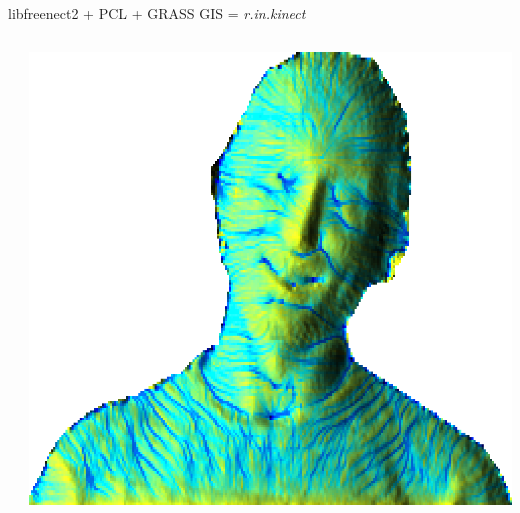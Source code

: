 \documentclass[xcolor={dvipsnames,usenames},beamer,aspectratio=169]{beamer}
\newcommand{\module}[1]{\emph{#1}}
\begin{document}
\begin{frame}{libfreenect2 + PCL + GRASS GIS = \module{r.in.kinect}}
\begin{columns}
\begin{column}{0.5\textwidth}
\begin{columns}
\begin{column}{0.2\textwidth}
\end{column}
\end{columns}

\end{column}
\begin{column}{0.45\textwidth}

\begin{center}
  \includegraphics[width=\textwidth]{tangible/face}
\end{center}

\end{column}
\end{columns}

\end{frame}
\end{document}
